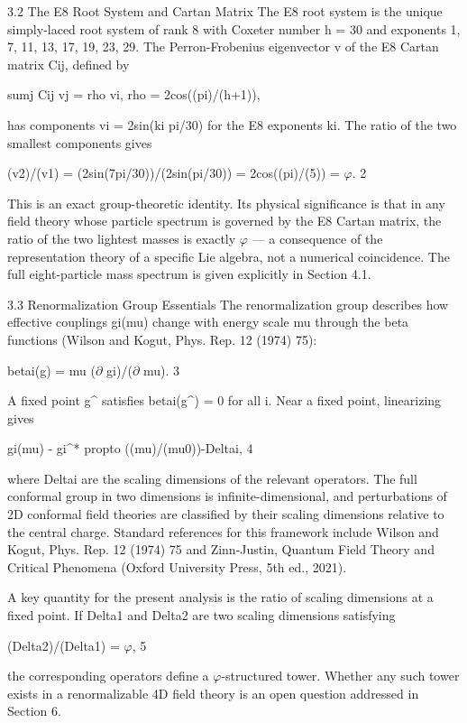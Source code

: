   3.2 The E8 Root System and Cartan Matrix
  The E8 root system is the unique simply-laced root system of rank 8 with Coxeter
  number h = 30 and exponents {1, 7, 11, 13, 17, 19, 23, 29}. The Perron-Frobenius
  eigenvector v of the E8 Cartan matrix Cij, defined by

  sumj Cij vj = rho vi, rho = 2cos((pi)/(h+1)),

  has components vi = 2sin(ki pi/30) for the E8 exponents ki. The ratio of the two smallest
  components gives

  (v2)/(v1) = (2sin(7pi/30))/(2sin(pi/30)) = 2cos((pi)/(5)) = $\varphi$. 2

  This is an exact group-theoretic identity. Its physical significance is that in any field
  theory whose particle spectrum is governed by the E8 Cartan matrix, the ratio of the
  two lightest masses is exactly $\varphi$ --- a consequence of the representation theory of a
  specific Lie algebra, not a numerical coincidence. The full eight-particle mass spectrum
  is given explicitly in Section 4.1.

  3.3 Renormalization Group Essentials
  The renormalization group describes how effective couplings gi(mu) change with
  energy scale mu through the beta functions (Wilson and Kogut, Phys. Rep. 12 (1974)
  75):

  betai(g) = mu ($\partial$ gi)/($\partial$ mu). 3

  A fixed point g\textasciicircum{} satisfies betai(g\textasciicircum{}) = 0 for all i. Near a fixed point, linearizing gives

  gi(mu) - gi\textasciicircum{}* propto ((mu)/(mu0))-Deltai, 4

  where Deltai are the scaling dimensions of the relevant operators. The full conformal
  group in two dimensions is infinite-dimensional, and perturbations of 2D conformal field
  theories are classified by their scaling dimensions relative to the central charge.
  Standard references for this framework include Wilson and Kogut, Phys. Rep. 12 (1974)
  75 and Zinn-Justin, Quantum Field Theory and Critical Phenomena (Oxford University
  Press, 5th ed., 2021).

  A key quantity for the present analysis is the ratio of scaling dimensions at a fixed point.
  If Delta1 and Delta2 are two scaling dimensions satisfying

  (Delta2)/(Delta1) = $\varphi$, 5

  the corresponding operators define a $\varphi$-structured tower. Whether any such tower
  exists in a renormalizable 4D field theory is an open question addressed in Section 6.

